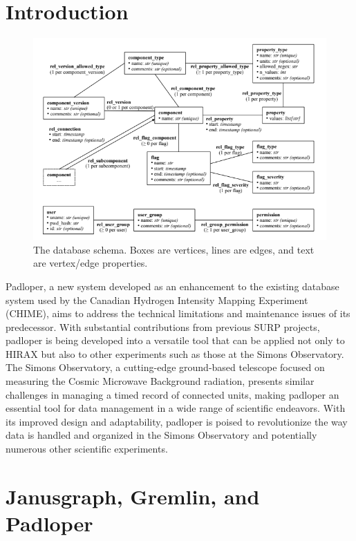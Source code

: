 \documentclass[apj]{emulateapj}
\begin{document}
\section{Introduction}
\label{sec:intro}
\begin{figure}
\includegraphics[width=1\columnwidth]{figs/save.png}
\caption{The database schema. Boxes are vertices, lines are edges, and text are vertex/edge
properties.\vspace{3mm}}
\label{fig:figureOfSpectrum}
\end{figure}

Padloper, a new system developed as an enhancement to the existing database system used by the Canadian Hydrogen Intensity Mapping Experiment (CHIME), aims to address the technical limitations and maintenance issues of its predecessor. With substantial contributions from previous SURP projects, padloper is being developed into a versatile tool that can be applied not only to HIRAX but also to other experiments such as those at the Simons Observatory. The Simons Observatory, a cutting-edge ground-based telescope focused on measuring the Cosmic Microwave Background radiation, presents similar challenges in managing a timed record of connected units, making padloper an essential tool for data management in a wide range of scientific endeavors. With its improved design and adaptability, padloper is poised to revolutionize the way data is handled and organized in the Simons Observatory and potentially numerous other scientific experiments.

\section{Janusgraph, Gremlin, and Padloper}
\label{sec:data}
\end{document}
